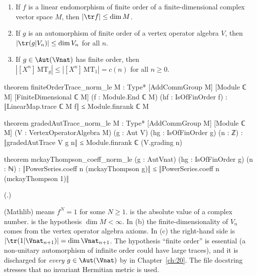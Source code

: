 \begin{theorem}\label{ch16:thm:tracebounds}
\begin{enumerate}[label=(\alph*)]
\item If $f$ is a linear endomorphism of finite order of a finite-dimensional complex vector space $M$, then
  $|\tr f|\le\dim M$.
\item If $g$ is an automorphism of finite order of a vertex operator algebra $V$, then $|\tr(g|V_n)|\le\dim V_n$ for
  all $n$.
\item If $g\in\Aut(\Vnat)$ has finite order, then $|[X^n]\,\mathrm{MT}_g|\le|[X^n]\,\mathrm{MT}_1|=c(n)$ for all
  $n\ge0$.
\end{enumerate}
\end{theorem}
\begin{leancode}
theorem finiteOrderTrace_norm_le {M : Type*} [AddCommGroup M] [Module ℂ M]
    [FiniteDimensional ℂ M] (f : Module.End ℂ M) (hf : IsOfFinOrder f) :
    ‖LinearMap.trace ℂ M f‖ ≤ Module.finrank ℂ M

theorem gradedAutTrace_norm_le {M : Type*} [AddCommGroup M] [Module ℂ M]
    (V : VertexOperatorAlgebra M) (g : Aut V) (hg : IsOfFinOrder g) (n : ℤ) :
    ‖gradedAutTrace V g n‖ ≤ Module.finrank ℂ (V.grading n)

theorem mckayThompson_coeff_norm_le (g : AutVnat) (hg : IsOfFinOrder g) (n : ℕ) :
    ‖PowerSeries.coeff n (mckayThompson g)‖ ≤
      ‖PowerSeries.coeff n (mckayThompson 1)‖
\end{leancode}
(.)
\begin{dictionary}
 (Mathlib) means $f^N=1$ for some $N\ge1$.   is the absolute value of a complex number.
\lean{[FiniteDimensional ℂ M]} is the hypothesis $\dim M<\infty$.  In (b) the finite-dimensionality of $V_n$ comes from
the vertex operator algebra axioms.  In (c) the right-hand side is $|\tr(1|\Vnat_{n+1})|=\dim\Vnat_{n+1}$.  The
hypothesis ``finite order'' is essential (a non-unitary automorphism of infinite order could have large traces), and
it is discharged for \emph{every} $g\in\Aut(\Vnat)$ by  in Chapter~\ref{ch:20}.  The file
docstring stresses that no invariant Hermitian metric is used.
\end{dictionary}
